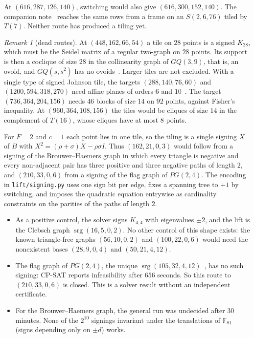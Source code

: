 \documentclass[11pt]{amsart}
\theoremstyle{remark}
\newtheorem{remark}[theorem]{Remark}
\newcommand{\F}{\mathbb{F}}
\DeclareMathOperator{\srg}{srg}
\begin{document}
At $(616,287,126,140)$, switching would also give $(616,300,152,140)$. The companion note~\cite{P496} reaches the same rows from a frame on an $S(2,6,76)$ tiled by $T(7)$. Neither route has produced a tiling yet.

\begin{remark}[dead routes]
At $(448,162,66,54)$ a tile on $28$ points is a signed $K_{28}$, which must be the Seidel matrix of a regular two-graph on $28$ points. Its support is then a coclique of size $28$ in the collinearity graph of $GQ(3,9)$, that is, an ovoid, and $GQ(s,s^2)$ has no ovoids~\cite[1.8.3]{PT09}. Larger tiles are not excluded. With a single type of signed Johnson tile, the targets $(288,140,76,60)$ and $(1200,594,318,270)$ need affine planes of orders $6$ and $10$~\cite{BR49,LTS89}. The target $(736,364,204,156)$ needs $46$ blocks of size $14$ on $92$ points, against Fisher's inequality. At $(960,364,108,156)$ the tiles would be cliques of size $14$ in the complement of $T(16)$, whose cliques have at most $8$ points.
\end{remark}

For $F=2$ and $c=1$ each point lies in one tile, so the tiling is a single signing $X$ of $B$ with $X^2=(\rho+\sigma)X-\rho\sigma I$. Thus $(162,21,0,3)$ would follow from a signing of the Brouwer--Haemers graph in which every triangle is negative and every non-adjacent pair has three positive and three negative paths of length $2$, and $(210,33,0,6)$ from a signing of the flag graph of $PG(2,4)$. The encoding in \texttt{lift/signing.py} uses one sign bit per edge, fixes a spanning tree to $+1$ by switching, and imposes the quadratic equation entrywise as cardinality constraints on the parities of the paths of length $2$.
\begin{itemize}
\item As a positive control, the solver signs $K_{4,4}$ with eigenvalues $\pm2$, and the lift is the Clebsch graph $\srg(16,5,0,2)$. No other control of this shape exists: the known triangle-free graphs $(56,10,0,2)$ and $(100,22,0,6)$ would need the nonexistent bases $(28,9,0,4)$ and $(50,21,4,12)$.
\item The flag graph of $PG(2,4)$, the unique $\srg(105,32,4,12)$~\cite{Coo05}, has no such signing: CP-SAT reports infeasibility after $656$ seconds. So this route to $(210,33,0,6)$ is closed. This is a solver result without an independent certificate.
\item For the Brouwer--Haemers graph, the general run was undecided after $30$ minutes. None of the $2^{10}$ signings invariant under the translations of $\F_{81}$ (signs depending only on $\pm d$) works.
\end{itemize}
\end{document}
